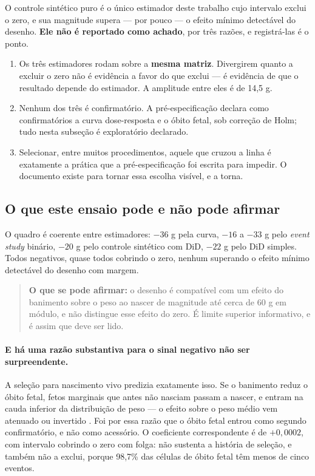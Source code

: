O controle sintético puro é o único estimador deste trabalho cujo intervalo
exclui o zero, e sua magnitude supera --- por pouco --- o efeito mínimo
detectável do desenho. \textbf{Ele não é reportado como achado}, por três
razões, e registrá-las é o ponto.

\begin{enumerate}
  \item Os três estimadores rodam sobre a \textbf{mesma matriz}. Divergirem
    quanto a excluir o zero não é evidência a favor do que exclui --- é
    evidência de que o resultado depende do estimador. A amplitude entre eles é
    de 14,5 g.
  \item Nenhum dos três é confirmatório. A pré-especificação declara como
    confirmatórios a curva dose-resposta e o óbito fetal, sob correção de Holm;
    tudo nesta subseção é exploratório declarado.
  \item Selecionar, entre muitos procedimentos, aquele que cruzou a linha é
    exatamente a prática que a pré-especificação foi escrita para impedir. O
    documento existe para tornar essa escolha visível, e a torna.
\end{enumerate}

\subsection{O que este ensaio pode e não pode afirmar}
\label{sub:balanco}

O quadro é coerente entre estimadores: \(-36\) g pela curva, \(-16\) a \(-33\) g
pelo \emph{event study} binário, \(-20\) g pelo controle sintético com DiD,
\(-22\) g pelo DiD simples. Todos negativos, quase todos cobrindo o zero, nenhum
superando o efeito mínimo detectável do desenho com margem.

\begin{quote}
\textbf{O que se pode afirmar:} o desenho é compatível com um efeito do
banimento sobre o peso ao nascer de magnitude até cerca de 60 g em módulo, e
não distingue esse efeito do zero. É limite superior informativo, e é assim que
deve ser lido.
\end{quote}

\paragraph{E há uma razão substantiva para o sinal negativo não ser
surpreendente.}
A seleção para nascimento vivo predizia exatamente isso. Se o banimento reduz o
óbito fetal, fetos marginais que antes não nasciam passam a nascer, e entram na
cauda inferior da distribuição de peso --- o efeito sobre o peso médio vem
atenuado ou invertido \citep{sorensen2025birth}. Foi por essa razão que o óbito
fetal entrou como segundo confirmatório, e não como acessório. O coeficiente
correspondente é de \(+0{,}0002\), com intervalo cobrindo o zero com folga: não
sustenta a história de seleção, e também não a exclui, porque 98,7\% das células
de óbito fetal têm menos de cinco eventos.

